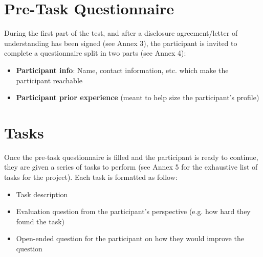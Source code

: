\documentclass[twocolumn, letterpaper,13pt]{scrartcl}
\begin{document}
    \section*{Pre-Task Questionnaire}
    
    During the first part of the test, and after a disclosure agreement/letter of understanding has been signed (see Annex 3), the participant is invited to complete a questionnaire split in two parts (see Annex 4):
    \begin{itemize}
        \item \textbf{Participant info}: Name, contact information, etc. which make the participant reachable
        \item \textbf{Participant prior experience} (meant to help size the participant's profile)
    \end{itemize}
    
    \section*{Tasks}
    
    Once the pre-task questionnaire is filled and the participant is ready to continue, they are given a series of tasks to perform (see Annex 5 for the exhaustive list of tasks for the project). Each task is formatted as follow:
    \begin{itemize}
        \item Task description
        \item Evaluation question from the participant's perspective (e.g. how hard they found the task)
        \item Open-ended question for the participant on how they would improve the question
    \end{itemize}
    
\end{document}

